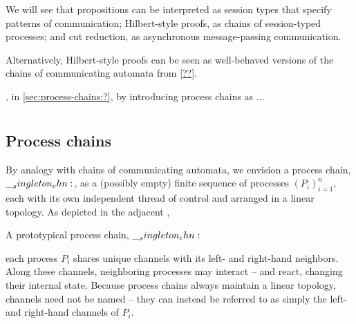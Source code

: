 We will see that 
propositions can be interpreted as session types that specify patterns of communication; Hilbert-style proofs, as chains of session-typed processes; and cut reduction, as asynchronous message-passing communication.

Alternatively, Hilbert-style proofs can be seen as well-behaved versions of the chains of communicating automata from \cref{??}.


, in \cref{sec:process-chains:?}, by introducing process chains as ...


\section{}

\subsection{Process chains}

%
By analogy with chains of communicating automata, we envision a process chain, $\__singleton_chn:$, as a (possibly empty) finite sequence of processes $(P_i)_{i=1}^{n}$, each with its own independent thread of control and arranged in a linear topology.
As depicted in the adjacent ,%
%
\begin{marginfigure}
  \centering
  \caption{A prototypical process chain, $\__singleton_chn:$}\label{fig:singleton-processes:chain-topology}
\end{marginfigure}
%
each process $P_i$ shares unique channels with its left- and right-hand neighbors. %
Along these channels, neighboring processes may interact -- and react, changing their internal state.
Because process chains always maintain a linear topology, 
channels need not be named -- they can instead be referred to as simply the left- and right-hand channels of $P_i$.

